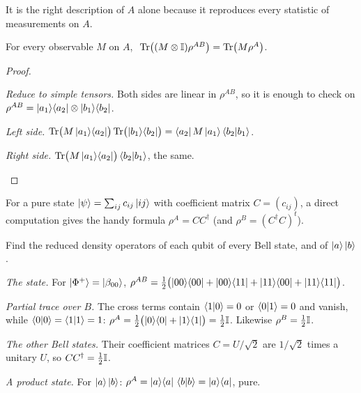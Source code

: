 It is the right description of $A$ alone because it reproduces every statistic of measurements on $A$.

\begin{proposition}\label{prop:reduced}
  For every observable $M$ on $A$, $\ \Tr\bigl((M\tp\Id)\rho^{AB}\bigr)=\Tr\bigl(M\rho^A\bigr)$.
\end{proposition}
\begin{proof}
  \begin{steps}
    \item \emph{Reduce to simple tensors.} Both sides are linear in $\rho^{AB}$, so it is enough to check on $\rho^{AB}=\left|a_1\right\rangle\!\left\langle a_2\right|\otimes\left|b_1\right\rangle\!\left\langle b_2\right|$.
    \item \emph{Left side.} $\operatorname{Tr}\bigl(M\left|a_1\right\rangle\!\left\langle a_2\right|\bigr)\operatorname{Tr}\bigl(\left|b_1\right\rangle\!\left\langle b_2\right|\bigr)=\left\langle a_2\right|M\left|a_1\right\rangle\left\langle b_2\middle|b_1\right\rangle$.
    \item \emph{Right side.} $\operatorname{Tr}\bigl(M\left|a_1\right\rangle\!\left\langle a_2\right|\bigr)\left\langle b_2\middle|b_1\right\rangle$, the same. \qedhere
  \end{steps}
\end{proof}

For a pure state $\left|\psi\right\rangle=\sum_{ij}c_{ij}\left|ij\right\rangle$ with coefficient matrix $C=(c_{ij})$, a direct computation gives the handy formula $\rho^A=CC^\dagger$ (and $\rho^B=(C^\dagger C)^t$).

\begin{example}\label{ex:reduced-bell}
  Find the reduced density operators of each qubit of every Bell state, and of $\left|a\right\rangle\left|b\right\rangle$.
\end{example}
\begin{solution}
  \begin{steps}
    \item \emph{The state.} For $\left|\Phi^+\right\rangle=\left|\beta_{00}\right\rangle$, $\rho^{AB}=\tfrac12\bigl(\left|00\right\rangle\!\left\langle00\right|+\left|00\right\rangle\!\left\langle11\right|+\left|11\right\rangle\!\left\langle00\right|+\left|11\right\rangle\!\left\langle11\right|\bigr)$.
    \item \emph{Partial trace over $B$.} The cross terms contain $\left\langle1\middle|0\right\rangle=0$ or $\left\langle0\middle|1\right\rangle=0$ and vanish, while $\left\langle0\middle|0\right\rangle=\left\langle1\middle|1\right\rangle=1$: $\rho^A=\tfrac12\bigl(\left|0\right\rangle\!\left\langle0\right|+\left|1\right\rangle\!\left\langle1\right|\bigr)=\tfrac12\mathbb{I}$. Likewise $\rho^B=\tfrac12\mathbb{I}$.
    \item \emph{The other Bell states.} Their coefficient matrices $C=U/\sqrt2$ are $1/\sqrt2$ times a unitary $U$, so $CC^\dagger=\tfrac12\mathbb{I}$.
    \item \emph{A product state.} For $\left|a\right\rangle\left|b\right\rangle$: $\rho^A=\left|a\right\rangle\!\left\langle a\right|\,\left\langle b\middle|b\right\rangle=\left|a\right\rangle\!\left\langle a\right|$, pure.
  \end{steps}
\end{solution}

